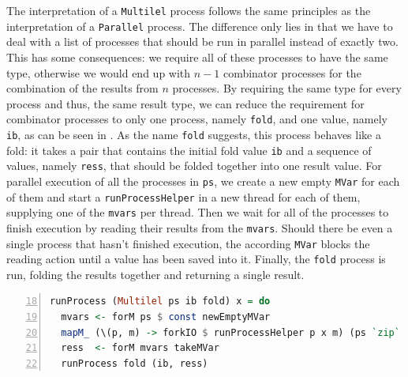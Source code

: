 The interpretation of a \texttt{Multilel} process follows the same principles as the interpretation of a \texttt{Parallel} process. The difference only lies in that we have to deal with a list of processes that should be run in parallel instead of exactly two. This has some consequences: we require all of these processes to have the same type, otherwise we would end up with $n-1$ combinator processes for the combination of the results from $n$ processes. By requiring the same type for every process and thus, the same result type, we can reduce the requirement for combinator processes to only one process, namely \texttt{fold}, and one value, namely \texttt{ib}, as can be seen in . As the name \texttt{fold} suggests, this process behaves like a fold: it takes a pair that contains the initial fold value \texttt{ib} and a sequence of values, namely \texttt{ress}, that should be folded together into one result value. For parallel execution of all the processes in \texttt{ps}, we create a new empty \texttt{MVar} for each of them and start a \texttt{runProcessHelper} in a new thread for each of them, supplying one of the \texttt{mvars} per thread. Then we wait for all of the processes to finish execution by reading their results from the \texttt{mvars}. Should there be even a single process that hasn't finished execution, the according \texttt{MVar} blocks the reading action until a value has been saved into it. Finally, the \texttt{fold} process is run, folding the results together and returning a single result.
\begin{lstlisting}[language=Haskell,caption=Implementation of the interpreter for \texttt{Multilel} processes.,label=lst:local_runprocess_multilel,numbers=left,frame=bt,firstnumber=18]
runProcess (Multilel ps ib fold) x = do
  mvars <- forM ps $ const newEmptyMVar
  mapM_ (\(p, m) -> forkIO $ runProcessHelper p x m) (ps `zip` mvars)
  ress  <- forM mvars takeMVar
  runProcess fold (ib, ress)
\end{lstlisting}

